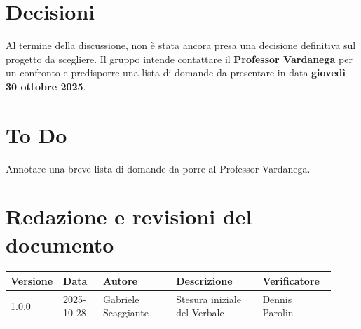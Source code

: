 \documentclass[a4paper,12pt]{article}
\begin{document}
\section{Decisioni}
Al termine della discussione, non è stata ancora presa una decisione definitiva sul progetto da scegliere.  
Il gruppo intende contattare il \textbf{Professor Vardanega} per un confronto e predisporre una lista di domande da presentare in data \textbf{giovedì 30 ottobre 2025}.

\section{To Do}
Annotare una breve lista di domande da porre al Professor Vardanega.

\clearpage
\section{Redazione e revisioni del documento}

\begin{center}
\small
\renewcommand{\arraystretch}{1.2} 
\begin{tabular}{|p{0.1\linewidth}|p{0.12\linewidth}|p{0.22\linewidth}|p{0.26\linewidth}|p{0.22\linewidth}|}
\hline
\rowcolor{gray!60} 
\textbf{Versione} & \textbf{Data} & \textbf{Autore} & \textbf{Descrizione} & \textbf{Verificatore} \\
\hline
\rowcolor{white}
1.0.0 & 2025-10-28 & Gabriele Scaggiante & Stesura iniziale del Verbale & Dennis Parolin \\
\hline

\end{tabular}
\end{center}
\end{document}
